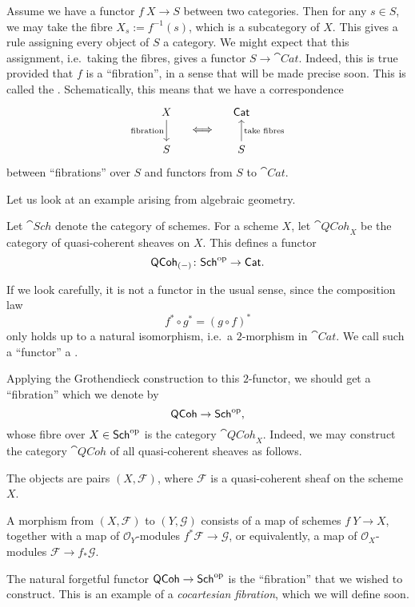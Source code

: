 Assume we have a functor $f\:X\to S$ between two categories.
Then for any $s\in S$, we may take the fibre $X_s:=f^{-1}(s)$,
which is a subcategory of $X$.
This gives a rule assigning every object of $S$ a category.
We might expect that this assignment, i.e.\ taking the fibres,
gives a functor $S\to\cat{Cat}$.
Indeed, this is true provided that $f$ is a ``fibration'',
in a sense that will be made precise soon.
This is called the .
Schematically, this means that we have a correspondence
\[\begin{tikzcd}[row sep=1ex,column sep=1em]
    X\ar[dd,"\text{fibration}"'] && \cat{Cat} \\
    & \Longleftrightarrow \\
    S && S\ar[uu,"\text{take fibres}"']
\end{tikzcd}\]
between ``fibrations'' over $S$ and functors from $S$ to $\cat{Cat}$.

Let us look at an example arising from algebraic geometry.

\begin{example}\label{eg-5-q}
    Let $\cat{Sch}$ denote the category of schemes.
    For a scheme $X$, let $\cat{QCoh}_X$ be the category 
    of quasi-coherent sheaves on $X$.
    This defines a functor 
    \[ \mathsf{QCoh}_{(-)}\colon\mathsf{Sch}^{\mathrm{op}}\to\mathsf{Cat}. \]

    If we look carefully, it is not a functor in the usual sense,
    since the composition law 
    \[ f^*\circ g^*=(g\circ f)^* \]
    only holds up to a natural isomorphism, i.e.\ a $2$-morphism in $\cat{Cat}$.
    We call such a ``functor'' a .

    Applying the Grothendieck construction to this $2$-functor,
    we should get a ``fibration'' which we denote by
    \[ \mathsf{QCoh}\to\mathsf{Sch}^{\mathrm{op}}, \]
    whose fibre over $X\in\mathsf{Sch}^{\mathrm{op}}$ is the category $\cat{QCoh}_X$.
    Indeed, we may construct the category $\cat{QCoh}$ of all quasi-coherent sheaves as follows.
    \begin{itms}
        \item The objects are pairs $(X,\mathscr F)$,
        where $\mathscr F$ is a quasi-coherent sheaf on the scheme $X$.
        \item A morphism from $(X,\mathscr F)$ to $(Y,\mathscr G)$
        consists of a map of schemes $f\:Y\to X$, together with
        a map of $\mathscr O_Y$-modules $f^*\mathscr F\to\mathscr G$, or equivalently,
        a map of $\mathscr O_X$-modules $\mathscr F\to f_*\mathscr G$.
    \end{itms}
    The natural forgetful functor $\mathsf{QCoh}\to\mathsf{Sch}^{\mathrm{op}}$
    is the ``fibration'' that we wished to construct.
    This is an example of a \emph{cocartesian fibration},
    which we will define soon. \varqed
\end{example}


